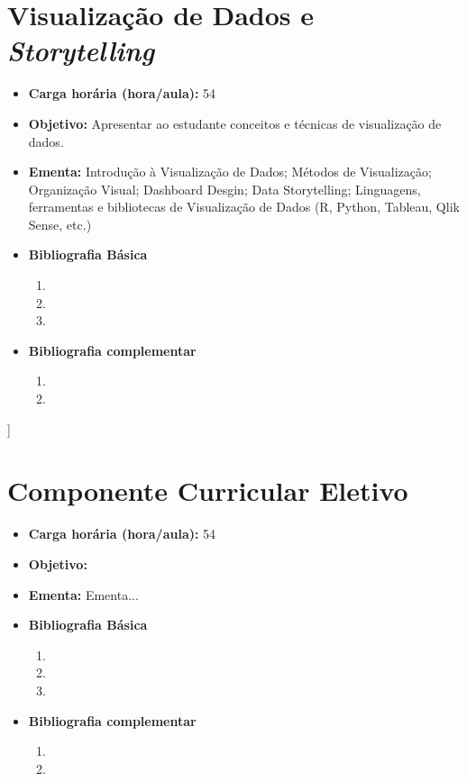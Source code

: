 \documentclass[11pt,fleqn]{book} %
\begin{document}
\section{Visualização de Dados e \textit{Storytelling}}\label{6_visstory}
\begin{itemize}
	\item \textbf{Carga horária (hora/aula):} 54
	\item \textbf{Objetivo:} Apresentar ao estudante conceitos e técnicas de visualização de dados.
	\item \textbf{Ementa:} 
	Introdução à Visualização de Dados;
	Métodos de Visualização;
	Organização Visual;
	Dashboard Desgin;
	Data Storytelling;
	Linguagens, ferramentas e bibliotecas de Visualização de Dados (R, Python, Tableau, Qlik Sense, etc.)
	\item \textbf{Bibliografia Básica}
	\begin{enumerate}
		\item 
		\item 
		\item 
	\end{enumerate}
	\item \textbf{Bibliografia complementar}
	\begin{enumerate}
		\item 
		\item
	\end{enumerate} 	
\end{itemize}
]


\newpage
\section{Componente Curricular Eletivo}\label{6_opt}
\begin{itemize}
	\item \textbf{Carga horária (hora/aula):} 54
	\item \textbf{Objetivo:} 
	\item \textbf{Ementa:} 
	Ementa...
	\item \textbf{Bibliografia Básica}
	\begin{enumerate}
		\item 
		\item 
		\item 
	\end{enumerate}
	\item \textbf{Bibliografia complementar}
	\begin{enumerate}
		\item 
		\item
	\end{enumerate} 	
\end{itemize}
\end{document}
